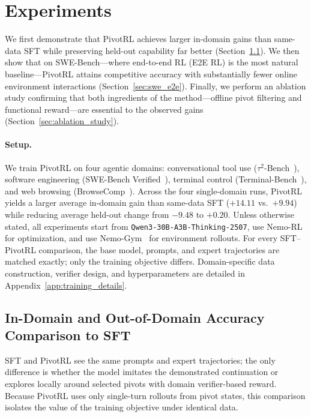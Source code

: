 \section{Experiments}
\label{sec:experiments}
 
We first demonstrate that PivotRL achieves larger in-domain gains than same-data SFT while preserving held-out capability far better (Section~\ref{sec:indomain_ood_sft}). We then show that on SWE-Bench---where end-to-end RL (E2E RL) is the most natural baseline---PivotRL attains competitive accuracy with substantially fewer online environment interactions (Section~\ref{sec:swe_e2e}). Finally, we perform an ablation study confirming that both ingredients of the method---offline pivot filtering and functional reward---are essential to the observed gains (Section~\ref{sec:ablation_study}).
 
\paragraph{Setup.}
We train PivotRL on four agentic domains: conversational tool use ($\tau^2$-Bench~\citep{barres2025tau2bench}), software engineering (SWE-Bench Verified~\citep{jimenez2024swebench}), terminal control (Terminal-Bench~\citep{tbench_2025}), and web browsing (BrowseComp~\citep{wei2025browsecompsimplechallengingbenchmark}). Across the four single-domain runs, PivotRL yields a larger average in-domain gain than same-data SFT ($+14.11$ vs.\ $+9.94$) while reducing average held-out change from $-9.48$ to $+0.20$. Unless otherwise stated, all experiments start from \texttt{Qwen3-30B-A3B-Thinking-2507}, use Nemo-RL~\citep{nemo-rl} for optimization, and use Nemo-Gym~\citep{nemo-gym} for environment rollouts. For every SFT--PivotRL comparison, the base model, prompts, and expert trajectories are matched exactly; only the training objective differs. Domain-specific data construction, verifier design, and hyperparameters are detailed in Appendix~\ref{app:training_details}.
 
\subsection{In-Domain and Out-of-Domain Accuracy Comparison to SFT}
\label{sec:indomain_ood_sft}
 
SFT and PivotRL see the same prompts and expert trajectories; the only difference is whether the model imitates the demonstrated continuation or explores locally around selected pivots with domain verifier-based reward. Because PivotRL uses only single-turn rollouts from pivot states, this comparison isolates the value of the training objective under identical data.
 
